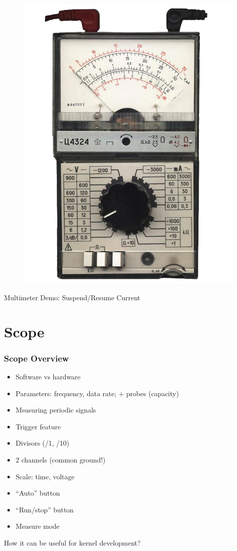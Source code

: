 \begin{frame}[standout]
  \begin{figure}
    \centering
    \includegraphics[scale=0.8]{images/multimeter.png}
  \end{figure}
  Multimeter Demo: Suspend/Resume Current
\end{frame}

\section{Scope}

\begin{frame}
  \frametitle{Scope Overview}
  \begin{itemize}
    \item Software vs hardware
    \item Parameters: frequency, data rate; + probes (capacity)
    \item Measuring periodic signals
    \item Trigger feature
    \item Divisors (/1, /10)
    \item 2 channels (common ground!)
    \item Scale: time, voltage
    \item ``Auto'' button
    \item ``Run/stop'' button
    \item Measure mode
  \end{itemize}
  How it can be useful for kernel development?
\end{frame}

